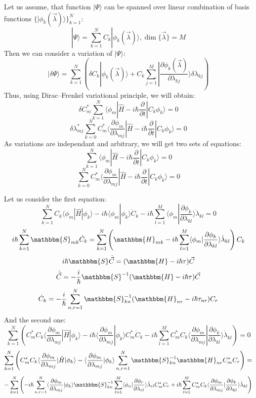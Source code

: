 Let us assume, that function $|\Psi\rangle$ can be spanned over linear combination of basis functions $\{|\phi_k(\vec{\lambda})\rangle\}_{k=1}^N$:
$$|\Psi\rangle = \sum_{k=1}^NC_k|\phi_k(\vec{\lambda})\rangle, \dim\{\vec{\lambda}\} = M$$
Then we can consider a variation of $|\Psi\rangle$:
$$|\delta\Psi\rangle = \sum_{k=1}^N \left( \delta C_k|\phi_k(\vec{\lambda})\rangle + %
					   C_k\sum_{j=1}^M|\frac{\partial\phi_k(\vec{\lambda})}{\partial\lambda_{kj}}\rangle\delta\lambda_{kj} \right)$$
Thus, using Dirac--Frenkel variational principle, we will obtain:
$$\delta C_m^*\sum_{k=1}^N\langle\phi_m|\hat{H}-i\hbar\frac{\partial}{\partial t}|C_k\phi_k\rangle=0$$
$$\delta\lambda_{mj}^*\sum_{k=0}^NC_m^*\langle\frac{\partial\phi_m}{\partial\lambda_{mj}}|\hat{H}-i\hbar\frac{\partial}{\partial t}|C_k\phi_k\rangle = 0$$
As variations are independant and arbitrary, we will get two sets of equations:
$$\sum_{k=1}^N\langle\phi_m|\hat{H}-i\hbar\frac{\partial}{\partial t}|C_k\phi_k\rangle=0$$
$$\sum_{k=0}^NC_m^*\langle\frac{\partial\phi_m}{\partial\lambda_{mj}}|\hat{H}-i\hbar\frac{\partial}{\partial t}|C_k\phi_k\rangle = 0$$

Let us consider the first equation:
$$\sum_{k=1}^N C_k\langle\phi_m|\hat{H}|\phi_k\rangle - %
	       i\hbar\langle\phi_m|\phi_k\rangle \dot{C}_k - %
	       i\hbar\sum_{l=1}^M\langle\phi_m|\frac{\partial\phi_k}{\partial\lambda_{kl}}\rangle\dot{\lambda}_{kl}=0$$
$$i\hbar\sum_{k=1}^N\mathbbm{S}_{mk}\dot{C}_k=\sum_{k=1}^N\left(\mathbbm{H}_{mk}-%
							  i\hbar\sum_{l=1}^M\langle\phi_m|\frac{\partial\phi_k}{\partial\lambda_{kl}}\rangle\dot{\lambda}_{kl}\right)C_k$$
$$i\hbar\mathbbm{S}\dot{\vec{C}}=(\mathbbm{H}-i\hbar\tau)\vec{C}$$
$$\dot{\vec{C}} = -\frac{i}{\hbar}\mathbbm{S}^{-1}(\mathbbm{H}-i\hbar\tau)\vec{C}$$
$$\dot{C}_k = -\frac{i}{\hbar}\sum_{n,r=1}^N \mathbbm{S}^{-1}_{kn}(\mathbbm{H}_{nr}-i\hbar\tau_{nr})C_r$$
And the second one:
$$\sum_{k=1}^N\left(C_m^*C_k\langle\frac{\partial\phi_m}{\partial\lambda_{mj}}|\hat{H}|\phi_k\rangle-%
	     i\hbar\langle\frac{\partial\phi_m}{\partial\lambda_{mj}}|\phi_k\rangle C_m^*\dot{C}_k-%
	     i\hbar\sum_{l=1}^MC_m^*C_k\langle\frac{\partial\phi_m}{\partial\lambda_{mj}}|\frac{\partial\phi_k}{\partial\lambda_{kl}}\rangle\dot{\lambda}_{kl}\right)=0$$
$$\sum_{k=1}^N\left(C_m^*C_k\langle\frac{\partial\phi_m}{\partial\lambda_{mj}}|\hat{H}|\phi_k\rangle-%
		    \langle\frac{\partial\phi_m}{\partial\lambda_{mj}}|\phi_k\rangle\sum_{n,r=1}^N\mathbbm{S}^{-1}_{kn}\mathbbm{H}_{nr}C_m^*C_r\right)=$$
$$= \sum_{k=1}^N\left(-i\hbar\sum_{n,r=1}^N\langle\frac{\partial\phi_m}{\partial\lambda_{mj}}|\phi_k\rangle\mathbbm{S}_{kn}^{-1}%
		             \sum_{l=1}^M\langle\phi_n|\frac{\partial\phi_r}{\partial\lambda_{rl}}\rangle\dot{\lambda}_{rl}C_m^*C_r+%
     		       i\hbar\sum_{l=1}^MC_m^*C_k\langle\frac{\partial\phi_m}{\partial\lambda_{mj}}|\frac{\partial\phi_k}{\partial\lambda_{kl}}\rangle\dot{\lambda}_{kl}\right)$$

